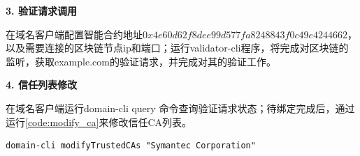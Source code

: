 \noindent\textbf{3. 验证请求调用}

在域名客户端配置智能合约地址$0x4e60d62f8dee99d577fa8248843f0c49e4244662$，以及需要连接的区块链节点ip和端口；运行validator-cli程序，将完成对区块链的监听，获取example.com的验证请求，并完成对其的验证工作。





\noindent\textbf{4. 信任列表修改}

在域名客户端运行domain-cli query 命令查询验证请求状态；待绑定完成后，通过运行\ref{code:modify_ca}来修改信任CA列表。

\begin{lstlisting}[caption={信任列表修改命令}, label={code:modify_ca}]
domain-cli modifyTrustedCAs "Symantec Corporation" 
\end{lstlisting}



